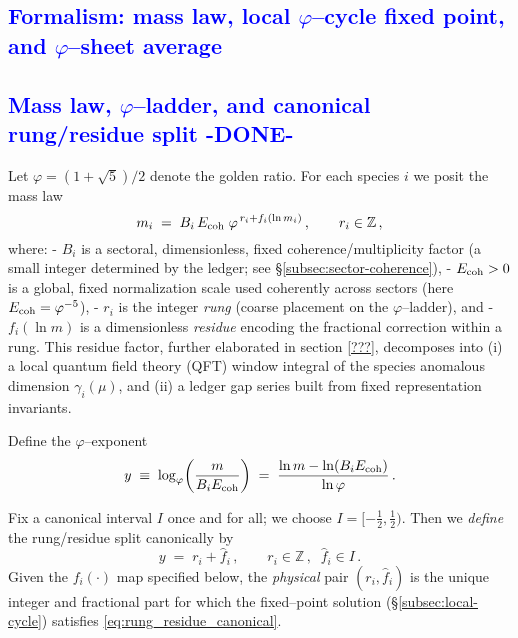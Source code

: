 \documentclass[%
 amsmath,amssymb,
 aps,
prb,
floatfix, showkeys
]{revtex4-2}
\newcommand{\modif}[1]{\textcolor{blue}{#1}}
\begin{document}
{\modif{
\section{Formalism: mass law, local $\varphi$--cycle fixed point, and $\varphi$--sheet average}
\label{sec:formalism}
}}

{\modif{
\subsection{Mass law, $\varphi$--ladder, and canonical rung/residue split  -DONE-}
\label{subsec:mass-law}
}}
Let $\varphi = (1+\sqrt{5})/2$ denote the golden ratio. For each species $i$ we posit the mass law
\begin{equation}
  m_i \;=\; B_i\,E_{\rm coh}\;\varphi^{\,r_i+f_i(\ln m_i)}\,,
  \qquad r_i\in\mathbb{Z}\,,
  \label{eq:mass_law}
\end{equation}
where:
- $B_i$ is a sectoral, dimensionless, fixed coherence/multiplicity factor (a small integer determined by the ledger; see \S\ref{subsec:sector-coherence}),
- $E_{\rm coh}>0$ is a global, fixed normalization scale used coherently across sectors (here $E_{\rm coh}=\varphi^{-5}$),
- $r_i$ is the integer \emph{rung} (coarse placement on the $\varphi$--ladder), and
- $f_i(\ln m)$ is a dimensionless \emph{residue} encoding the fractional correction within a rung.
This residue factor, further elaborated in section \ref{???},
decomposes into (i) a local quantum field theory (QFT) window integral
of the species anomalous dimension $\gamma_i(\mu)$, and (ii) a ledger gap series built
from fixed representation invariants.


Define the $\varphi$–exponent
\[
  y \;\equiv\; \log_{\varphi}\!\left(\frac{m}{B_i E_{\rm coh}}\right)
  \;=\; \frac{\ln m - \ln(B_i E_{\rm coh})}{\ln\varphi}\,.
  \]
  
Fix a canonical interval $I$ once and for all; we choose $I=[-\tfrac{1}{2},\tfrac{1}{2})$. Then we \emph{define} the rung/residue split canonically by
\begin{equation}
  y \;=\; r_i + \widehat f_i\,,
  \qquad r_i\in\mathbb{Z}\,,\;\; \widehat f_i\in I\,.
  \label{eq:rung_residue_canonical}
\end{equation}
Given the $f_i(\cdot)$ map specified below, the \emph{physical} pair $(r_i,\widehat f_i)$ is the unique integer and fractional part for which the fixed–point solution (\S\ref{subsec:local-cycle}) satisfies \eqref{eq:rung_residue_canonical}.
\end{document}
